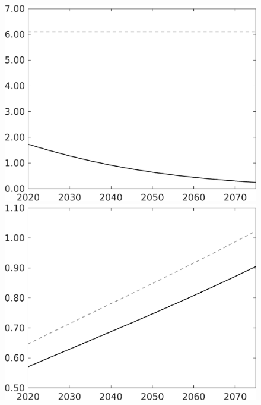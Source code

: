 \documentclass[12pt]{article}
\begin{document}
\begin{figure}[h!!]
\begin{minipage}[]{0.32\textwidth}
\end{minipage}	
\begin{minipage}[]{0.32\textwidth}
\includegraphics[width=1\textwidth]{../../codding_model/own_basedOnFried/optimalPol_010922_revision/figures/all_13Sept22/LevTaufNoTauf_TaulCalib_Equlab_regime0_pgpftf_spillover0_nsk0_xgr1_knspil1_sep1_LFlimit0_emsbase0_countec0_GovRev0_etaa0.79_lgd0.png}
\end{minipage}
\begin{minipage}[]{0.32\textwidth}
\includegraphics[width=1\textwidth]{../../codding_model/own_basedOnFried/optimalPol_010922_revision/figures/all_13Sept22/LevTaufNoTauf_TaulCalib_Equlab_regime0_E_spillover0_nsk0_xgr1_knspil1_sep1_LFlimit0_emsbase0_countec0_GovRev0_etaa0.79_lgd0.png}

\end{minipage}
\end{figure}
\end{document}
